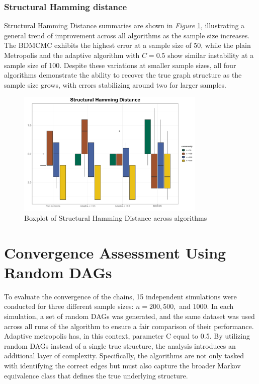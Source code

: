 \documentclass{report}
\begin{document}
\subsubsection{Structural Hamming distance}

Structural Hamming Distance summaries are shown in \textit{Figure} \ref{fig:shd}, illustrating a general trend of improvement across all algorithms as the sample size increases. The BDMCMC exhibits the highest error at a sample size of 50, while the plain Metropolis and the adaptive algorithm with $C = 0.5$ show similar instability at a sample size of 100. Despite these variations at smaller sample sizes, all four algorithms demonstrate the ability to recover the true graph structure as the sample size grows, with errors stabilizing around two for larger samples.

\begin{figure}[h] 
	\centering
	\includegraphics[width=0.8\textwidth]{Figures/Overall_comparison/Boxplot_shd.png}
	\caption{Boxplot of Structural Hamming Distance across algorithms}
	\label{fig:shd}
\end{figure}

\section{Convergence Assessment Using Random DAGs}

To evaluate the convergence of the chains, 15 independent simulations were conducted for three different sample sizes: $n = 200, 500,$ and $1000$. In each simulation, a set of random DAGs was generated, and the same dataset was used across all runs of the algorithm to ensure a fair comparison of their performance. Adaptive metropolis has, in this context, parameter C equal to 0.5.
By utilizing random DAGs instead of a single true structure, the analysis introduces an additional layer of complexity. Specifically, the algorithms are not only tasked with identifying the correct edges but must also capture the broader Markov equivalence class that defines the true underlying structure. 
\end{document}
